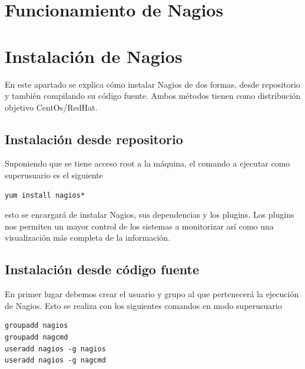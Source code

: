 \documentclass[11pt,a4paper]{article}
\begin{document}
    
\section{Funcionamiento de Nagios}




\section{Instalación de Nagios}

En este apartado se explica cómo instalar Nagios de dos formas, desde repositorio y también compilando su código fuente. Ambos métodos tienen como distribución objetivo CentOs/RedHat.

\subsection{Instalación desde repositorio}

Suponiendo que se tiene acceso root a la máquina, el comando a ejecutar como superusuario es el siguiente

\begin{verbatim}
yum install nagios*
\end{verbatim}

esto se encargará de instalar Nagios, sus dependencias y los plugins. Los plugins nos permiten un mayor control de los sistemas a monitorizar así como una visualización más completa de la información.

\subsection{Instalación desde código fuente}

En primer lugar debemos crear el usuario y grupo al que pertenecerá la ejecución de Nagios. Esto se realiza con los siguientes comandos en modo superusuario

\begin{verbatim}
groupadd nagios
groupadd nagcmd
useradd nagios -g nagios
useradd nagios -g nagcmd
\end{verbatim}
\end{document}
